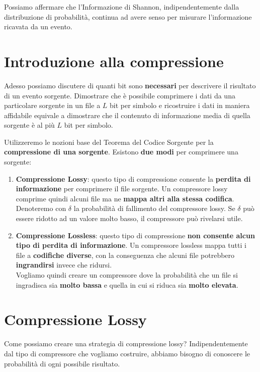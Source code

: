 Possiamo affermare che l'Informazione di Shannon, indipendentemente dalla distribuzione di probabilità, continua ad avere senso per misurare l'informazione ricavata da un evento.

\newpage
\section{Introduzione alla compressione}
Adesso possiamo discutere di quanti bit sono \textbf{necessari} per descrivere il risultato di un evento sorgente.
Dimostrare che è possibile comprimere i dati da una particolare sorgente in un file a $L$ bit per simbolo e ricostruire i dati in maniera affidabile equivale a dimostrare che il contenuto di informazione media di quella sorgente è al più $L$ bit per simbolo.

Utilizzeremo le nozioni base del Teorema del Codice Sorgente per la \textbf{compressione di una sorgente}. Esistono \textbf{due modi} per comprimere una sorgente:
\begin{enumerate}
	\item \textbf{Compressione Lossy}: questo tipo di compressione consente la \textbf{perdita di informazione} per comprimere il file sorgente. Un compressore lossy comprime quindi alcuni file ma ne \textbf{mappa altri alla stessa codifica}.\\ Denoteremo con $\delta$ la probabilità di fallimento del compressore lossy. Se $\delta$ può essere ridotto ad un valore molto basso, il compressore può rivelarsi utile.
	
	\item \textbf{Compressione Lossless}: questo tipo di compressione \textbf{non consente alcun tipo di perdita di informazione}. Un compressore lossless mappa tutti i file a \textbf{codifiche diverse}, con la conseguenza che alcuni file potrebbero \textbf{ingrandirsi} invece che ridursi.\\
	Vogliamo quindi creare un compressore dove la probabilità che un file si ingradisca sia \textbf{molto bassa} e quella in cui si riduca sia \textbf{molto elevata}.
\end{enumerate}

\section{Compressione Lossy}
Come possiamo creare una strategia di compressione lossy?
Indipendentemente dal tipo di compressore che vogliamo costruire, abbiamo bisogno di conoscere le probabilità di ogni possibile risultato.

